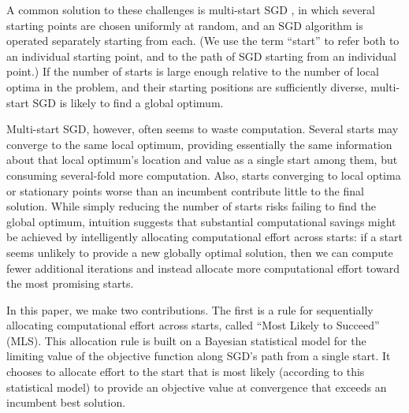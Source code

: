 \documentclass[12pt,english]{article}
\newcommand{\abbrv}{MLS}
\newcommand{\name}{Most Likely to Succeed}
\begin{document}
A common solution to these challenges is multi-start SGD \citep{schoen:1991,marti:2016}, in which several starting points are chosen uniformly at random, and an SGD algorithm is operated separately starting from each.
(We use the term ``start'' to refer both to an individual starting point, and to the path of SGD starting from an individual point.)
If the number of starts is large enough relative to the number of local optima in the problem, and their starting positions are sufficiently diverse, multi-start SGD is likely to find a global optimum.  

Multi-start SGD, however, often seems to waste computation.  Several starts may converge to the same local optimum, providing essentially the same information about that local optimum's location and value as a single start among them, but consuming several-fold more computation. Also, starts converging to local optima or stationary points worse than an incumbent contribute little to the final solution.
While simply reducing the number of starts risks failing to find the global optimum, intuition suggests that substantial computational savings might be achieved by intelligently allocating computational effort across starts: if a start seems unlikely to provide a new globally optimal solution, then we can compute fewer additional iterations and instead allocate more computational effort toward the most promising starts.


In this paper, we make two contributions. The first is a rule for sequentially allocating computational effort across starts, called ``\name'' (\abbrv).  This allocation rule is built on a Bayesian statistical model for the limiting value of the objective function along SGD's path from a single start.  It chooses to allocate effort to the start that is most likely (according to this statistical model) to provide an objective value at convergence that exceeds an incumbent best solution.

\end{document}
